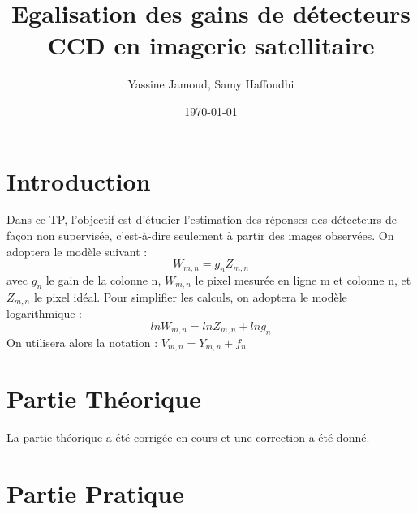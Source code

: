 \documentclass[12pt,a4paper,titlepage]{article}
\title{Egalisation des gains de détecteurs CCD en imagerie satellitaire}
\author{Yassine Jamoud, Samy Haffoudhi}
\date{\today}
\begin{document}
\maketitle

\section*{Introduction}
Dans ce TP, l'objectif est d'étudier l’estimation des réponses des détecteurs de façon non supervisée, c’est-à-dire seulement à partir des images observées. On adoptera le modèle suivant : 
$$
	W_{m,n}=g_nZ_{m,n}
$$
avec $g_n$ le gain de la colonne n, $W_{m,n}$ le pixel mesurée en ligne m et colonne n, et $Z_{m,n}$ le pixel
idéal. Pour simplifier les calculs, on adoptera le modèle logarithmique : 
$$
	ln W_{m,n} = ln Z_{m,n} + ln g_n
$$
On utilisera alors la notation : $V_{m,n} = Y_{m,n} +f_n$
\section{Partie Théorique}
La partie théorique a été corrigée en cours et une correction a été donné.




\section{Partie Pratique}
\end{document}
